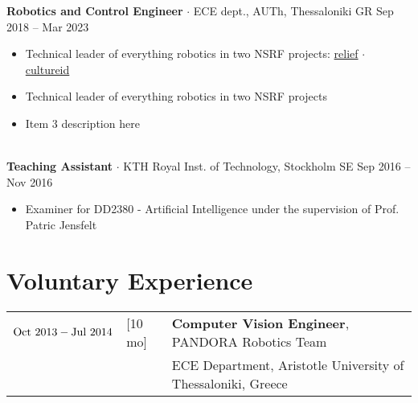 \documentclass[a4paper,10pt,twoside]{article}
\begin{document}
  \textbf{Robotics and Control Engineer} $\cdot$ ECE dept., AUTh, Thessaloniki GR \hfill Sep 2018 -- Mar 2023 \\
  \begin{minipage}[t]{\textwidth}
    \begin{itemize}
      \item Technical leader of everything robotics in two NSRF projects: \href{https://relief.web.auth.gr/language/en/home/}{relief} $\cdot$ \href{https://cultureid.web.auth.gr/?page\_id=200&lang=en}{cultureid} \vspace{-0.8em}
      \item Technical leader of everything robotics in two NSRF projects \vspace{-0.8em}
      \item Item 3 description here
    \end{itemize}
  \end{minipage} \\[0.4em]

  \textbf{Teaching Assistant} $\cdot$ KTH Royal Inst. of Technology, Stockholm SE \hfill Sep 2016 -- Nov 2016 \\
  \begin{minipage}[t]{\textwidth}
    \begin{itemize}
      \item Examiner for DD2380 - Artificial Intelligence under the supervision of Prof. Patric Jensfelt
    \end{itemize}
  \end{minipage}
\section{Voluntary Experience}

\begin{tabular}{rlp{12cm}}
$\textnormal{Oct }2013 - \textnormal{Jul }2014$ & \hspace{-0.4cm} [10 mo] & \textbf{Computer Vision Engineer}, PANDORA Robotics Team \\
                    & & ECE Department, Aristotle University of Thessaloniki, Greece
\end{tabular}


\end{document}
